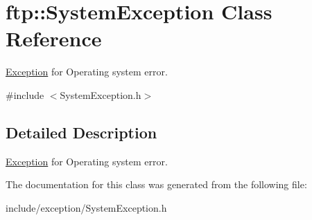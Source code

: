 \hypertarget{classftp_1_1_system_exception}{\section{ftp\-:\-:System\-Exception Class Reference}
\label{classftp_1_1_system_exception}
}


\hyperlink{classftp_1_1_exception}{Exception} for Operating system error.  




{\ttfamily \#include $<$System\-Exception.\-h$>$}



\subsection{Detailed Description}
\hyperlink{classftp_1_1_exception}{Exception} for Operating system error. 

The documentation for this class was generated from the following file\-:\begin{DoxyCompactItemize}
\item 
include/exception/System\-Exception.\-h\end{DoxyCompactItemize}
